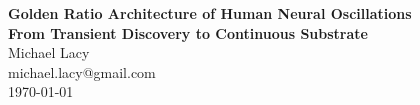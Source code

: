 \documentclass[11pt,a4paper]{article}
\begin{document}
\begin{center}
{\LARGE \textbf{Golden Ratio Architecture of Human Neural Oscillations}}\\[0.3cm]
{\Large \textbf{From Transient Discovery to Continuous Substrate}}\\[1cm]

{\large Michael Lacy}\\[0.5cm]
{\small michael.lacy@gmail.com}\\[0.5cm]

\today
\end{center}

\vspace{0.5cm}

\end{document}
